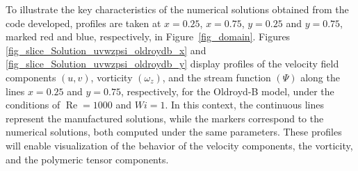 \documentclass[preprint, 12pt]{elsarticle}
\begin{document}
To illustrate the key characteristics of the numerical solutions obtained from the code developed, profiles are taken at $x=0.25$, $x=0.75$, $y=0.25$ and $y=0.75$, marked red and blue, respectively, in Figure~\ref{fig_domain}. Figures \ref{fig_slice_Solution_uvwzpsi_oldroydb_x} and \ref{fig_slice_Solution_uvwzpsi_oldroydb_y} display profiles of the velocity field components $(u, v)$, vorticity $(\omega_z)$, and the stream function $(\Psi)$ along the lines $x=0.25$ and $y=0.75$, respectively, for the Oldroyd-B model, under the conditions of $\operatorname{Re}=1000$ and $Wi=1$. In this context, the continuous lines represent the manufactured solutions, while the markers correspond to the numerical solutions, both computed under the same parameters. These profiles will enable visualization of the behavior of the velocity components, the vorticity, and the polymeric tensor components.
\end{document}
